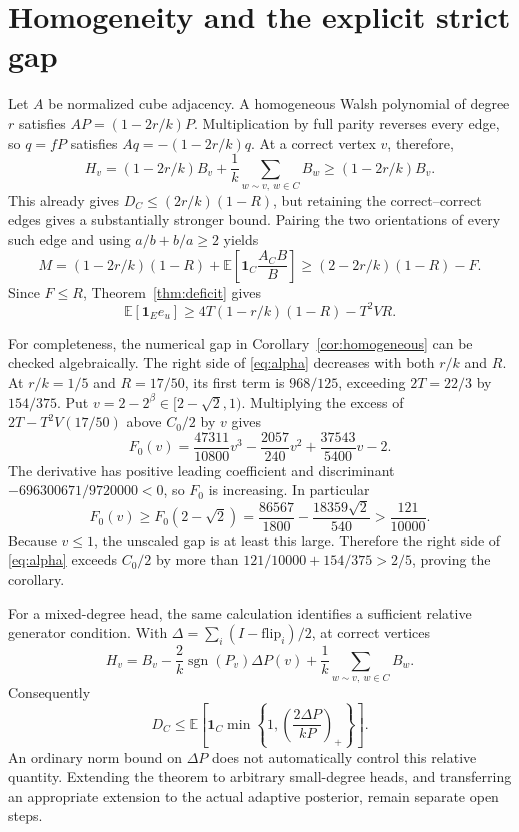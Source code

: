 \documentclass[11pt]{article}
\newcommand{\E}{\mathbb E}
\newcommand{\1}{\mathbf 1}
\DeclareMathOperator{\sgn}{sgn}
\begin{document}
\section{Homogeneity and the explicit strict gap}
Let $A$ be normalized cube adjacency. A homogeneous Walsh polynomial
of degree $r$ satisfies $AP=(1-2r/k)P$. Multiplication by full parity
reverses every edge, so $q=fP$ satisfies
$Aq=-(1-2r/k)q$. At a correct vertex $v$, therefore,
\[
 H_v=(1-2r/k)B_v+\frac1k\sum_{w\sim v,\ w\in C}B_w
       \ge(1-2r/k)B_v.
\]
This already gives $D_C\le(2r/k)(1-R)$, but retaining the
correct--correct edges gives a substantially stronger bound. Pairing the
two orientations of every such edge and using $a/b+b/a\ge2$ yields
\[
 M=(1-2r/k)(1-R)+\E\left[\1_C\frac{A_C B}{B}\right]
 \ge (2-2r/k)(1-R)-F.
\]
Since $F\le R$, Theorem~\ref{thm:deficit} gives
\begin{equation}\label{eq:alpha}
 \E[\1_Ee_u]\ge4T(1-r/k)(1-R)-T^2VR.
\end{equation}

For completeness, the numerical gap in Corollary~\ref{cor:homogeneous}
can be checked algebraically. The right side of \eqref{eq:alpha}
decreases with both $r/k$ and $R$. At $r/k=1/5$ and $R=17/50$, its
first term is $968/125$, exceeding $2T=22/3$ by $154/375$.
Put $v=2-2^\beta\in[2-\sqrt2,1)$. Multiplying the excess of
$2T-T^2V(17/50)$ above $C_0/2$ by $v$ gives
\[
 F_0(v)=\frac{47311}{10800}v^3-\frac{2057}{240}v^2
                         +\frac{37543}{5400}v-2.
\]
The derivative has positive leading coefficient and discriminant
$-696300671/9720000<0$, so $F_0$ is increasing. In particular
\[
 F_0(v)\ge F_0(2-\sqrt2)
 =\frac{86567}{1800}-\frac{18359\sqrt2}{540}
 >\frac{121}{10000}.
\]
Because $v\le1$, the unscaled gap is at least this large. Therefore the
right side of \eqref{eq:alpha} exceeds $C_0/2$ by more than
$121/10000+154/375>2/5$, proving the corollary.

For a mixed-degree head, the same calculation identifies a sufficient
relative generator condition. With
$\Delta=\sum_i(I-\mathrm{flip}_i)/2$, at correct vertices
\[
 H_v=B_v-\frac2k\sgn(P_v)\Delta P(v)
          +\frac1k\sum_{w\sim v,\ w\in C}B_w.
\]
Consequently
\[
 D_C\le\E\!\left[\1_C\min\left\{1,
                  \left(\frac{2\Delta P}{kP}\right)_+\right\}\right].
\]
An ordinary norm bound on $\Delta P$ does not automatically control
this relative quantity. Extending the theorem to arbitrary small-degree
heads, and transferring an appropriate extension to the actual adaptive
posterior, remain separate open steps.
\end{document}
